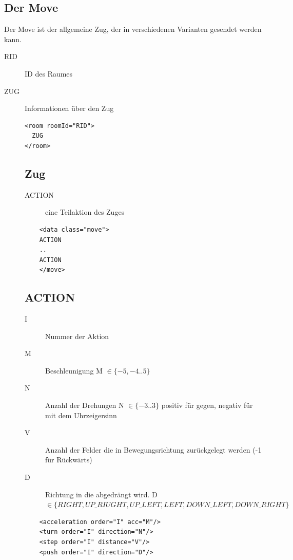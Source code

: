 \documentclass[12pt,a4paper, ngerman, oneside]{scrartcl}
\begin{document}
\subsection{\label{Move}Der Move}
Der Move ist der allgemeine Zug, der in verschiedenen Varianten gesendet werden kann.
\begin{description}
\item[RID] ID des Raumes
\item[ZUG] Informationen über den Zug
\begin{verbatim}
<room roomId="RID">
  ZUG
</room>

\end{verbatim}
\subsection{Zug}
\label{move}
\begin{description}
\item[ACTION] eine Teilaktion des Zuges
\end{description}
\begin{verbatim}
	<data class="move">
    ACTION
    ..
    ACTION
	</move>
\end{verbatim}

\subsection{ACTION}
\label{action}
\begin{description}
\item[I] Nummer der Aktion
\item[M] Beschleunigung M $\in \{-5,-4..5\}$
\item[N] Anzahl der Drehungen N $\in \{-3..3\}$ positiv für gegen, negativ für mit dem Uhrzeigersinn
\item[V] Anzahl der Felder die in Bewegungsrichtung zurückgelegt werden (-1 für Rückwärts)
\item[D] Richtung in die abgedrängt wird. D $\in \{RIGHT, UP\_RIUGHT, UP\_LEFT, LEFT, DOWN\_LEFT, DOWN\_RIGHT\}$
\end{description}
\begin{verbatim}
	<acceleration order="I" acc="M"/>
	<turn order="I" direction="N"/>
	<step order="I" distance="V"/>
	<push order="I" direction="D"/>
\end{verbatim}
\end{description}
\end{document}
